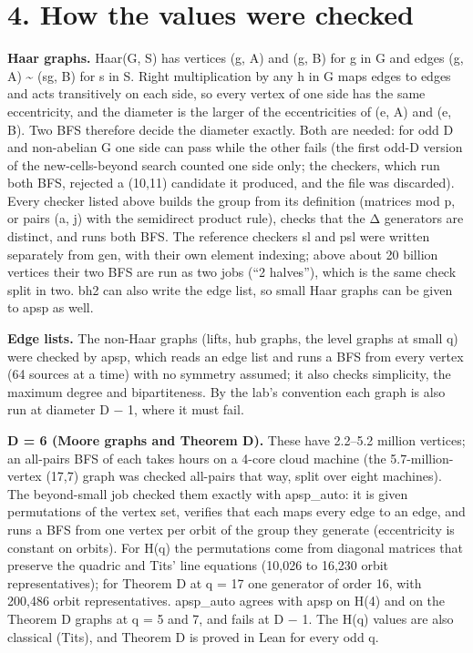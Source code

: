 \documentclass[
  10pt,
]{article}
\begin{document}
\hypertarget{how-the-values-were-checked}{%
\section{4. How the values were checked}\label{how-the-values-were-checked}}

\textbf{Haar graphs.} Haar(G, S) has vertices (g, A) and (g, B) for g in G and edges (g, A) \textasciitilde{} (sg, B)
for s in S. Right multiplication by any h in G maps edges to edges and acts transitively on each side, so every vertex
of one side has the same eccentricity, and the diameter is the larger of the eccentricities of (e, A) and (e, B). Two
BFS therefore decide the diameter exactly. Both are needed: for odd D and non-abelian G one side can pass while the
other fails (the first odd-D version of the new-cells-beyond search counted one side only; the checkers, which run
both BFS, rejected a (10,11) candidate it produced, and the file was discarded). Every checker listed above builds the
group from its definition (matrices mod p, or pairs (a, j) with the semidirect product rule), checks that the Δ
generators are distinct, and runs both BFS. The reference checkers sl and psl were written separately from gen, with
their own element indexing; above about 20 billion vertices their two BFS are run as two jobs (``2 halves''), which is
the same check split in two. bh2 can also write the edge list, so small Haar graphs can be given to apsp as well.

\textbf{Edge lists.} The non-Haar graphs (lifts, hub graphs, the level graphs at small q) were checked by apsp, which
reads an edge list and runs a BFS from every vertex (64 sources at a time) with no symmetry assumed; it also checks
simplicity, the maximum degree and bipartiteness. By the lab's convention each graph is also run at diameter D − 1,
where it must fail.

\textbf{D = 6 (Moore graphs and Theorem D).} These have 2.2--5.2 million vertices; an all-pairs BFS of each takes
hours on a 4-core cloud machine (the 5.7-million-vertex (17,7) graph was checked all-pairs that way, split over eight
machines). The beyond-small job checked them exactly with apsp\_auto: it is given permutations of the vertex set,
verifies that each maps every edge to an edge, and runs a BFS from one vertex per orbit of the group they generate
(eccentricity is constant on orbits). For H(q) the permutations come from diagonal matrices that preserve the quadric
and Tits' line equations (10,026 to 16,230 orbit representatives); for Theorem D at q = 17 one generator of order 16,
with 200,486 orbit representatives. apsp\_auto agrees with apsp on H(4) and on the Theorem D graphs at q = 5 and 7,
and fails at D − 1. The H(q) values are also classical (Tits), and Theorem D is proved in Lean for every odd q.
\end{document}
